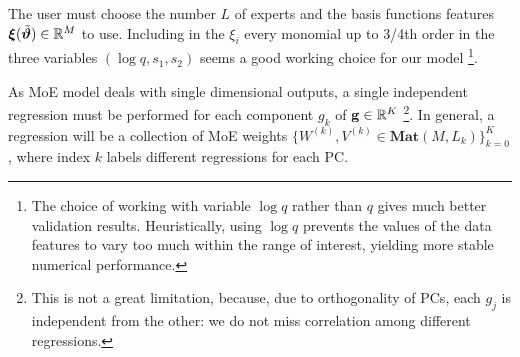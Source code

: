 \par
The user must choose the number $L$ of experts and the basis functions features ${\boldsymbol{\xi}}({\tilde{\boldsymbol{\vartheta}}}) \in \mathbb{R}^{M}$ to use.
Including in the $\xi_i$ every monomial up to 3/4th order in the three variables $ (\log q, s_1, s_2)$ seems a good working choice for our model
\footnote{
The choice of working with variable $\log q$ rather than $q$ gives much better validation results.
Heuristically, using $\log q$ prevents the values of the data features to vary too much within the range of interest, yielding more stable numerical performance.
}.
\par
As MoE model deals with single dimensional outputs, a single independent regression must be performed for each component $g_k$ of $\mathbf{g} \in \mathbb{R}^K$
\footnote{This is not a great limitation, because, due to orthogonality of PCs, each $g_j$ is independent from the other: we do not miss correlation among different regressions.}.
In general, a regression will be a collection of MoE weights ${\{ W^{(k)}, V^{(k)} \in \mathbf{Mat}(M,L_k) \}_{k=0}^K}$, where index $k$ labels different regressions for each PC.

